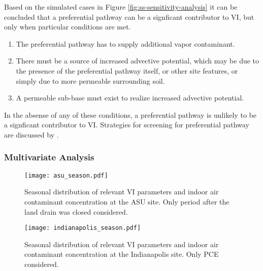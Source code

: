 \documentclass[journal=esthag,manuscript=article]{achemso}
\begin{document}
Based on the simulated cases in Figure \ref{fig:ss-sensitivity-analysis} it can be concluded that a preferential pathway can be a signficant contributor to VI, but only when particular conditions are met.
\begin{enumerate}
  \item The preferential pathway has to supply additional vapor contaminant.
  \item There must be a source of increased advective potential, which may be due to the presence of the preferential pathway itself, or other site features, or simply due to more permeable surrounding soil.
  \item A permeable sub-base must exist to realize increased advective potential.
\end{enumerate}
In the absense of any of these conditions, a preferential pathway is unlikely to be a signficant contributor to VI.
Strategies for screening for preferential pathway are discussed by \citeauthor{nielsen_remediation_2017}\cite{nielsen_remediation_2017}. \par

\subsubsection{Multivariate Analysis}

\begin{figure}[htb!]
  \caption{Seasonal distribution of relevant VI parameters and indoor air contaminant concentration at the ASU site. Only period after the land drain was closed considered.}
  \label{fig:asu_season}
  \texttt{[image: asu\_season.pdf]}
\end{figure}

\begin{figure}[htb!]
  \caption{Seasonal distribution of relevant VI parameters and indoor air contaminant concentration at the Indianapolis site. Only PCE considered.}
  \label{fig:indianapolis_season}
  \texttt{[image: indianapolis\_season.pdf]}
\end{figure}
\end{document}
